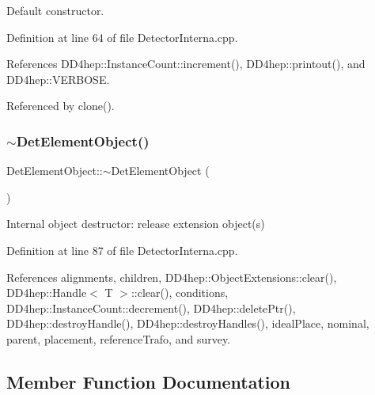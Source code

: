 Default constructor. 



Definition at line 64 of file Detector\+Interna.\+cpp.



References D\+D4hep\+::\+Instance\+Count\+::increment(), D\+D4hep\+::printout(), and D\+D4hep\+::\+V\+E\+R\+B\+O\+SE.



Referenced by clone().

\hypertarget{class_d_d4hep_1_1_geometry_1_1_det_element_object_a96c026595b89aa43a03d2406c52a778d}{}\label{class_d_d4hep_1_1_geometry_1_1_det_element_object_a96c026595b89aa43a03d2406c52a778d} 
\subsubsection{\texorpdfstring{$\sim$\+Det\+Element\+Object()}{~DetElementObject()}}
{\footnotesize\ttfamily Det\+Element\+Object\+::$\sim$\+Det\+Element\+Object (\begin{DoxyParamCaption}{ }\end{DoxyParamCaption})\hspace{0.3cm}{\ttfamily [virtual]}}



Internal object destructor\+: release extension object(s) 



Definition at line 87 of file Detector\+Interna.\+cpp.



References alignments, children, D\+D4hep\+::\+Object\+Extensions\+::clear(), D\+D4hep\+::\+Handle$<$ T $>$\+::clear(), conditions, D\+D4hep\+::\+Instance\+Count\+::decrement(), D\+D4hep\+::delete\+Ptr(), D\+D4hep\+::destroy\+Handle(), D\+D4hep\+::destroy\+Handles(), ideal\+Place, nominal, parent, placement, reference\+Trafo, and survey.



\subsection{Member Function Documentation}
\hypertarget{class_d_d4hep_1_1_geometry_1_1_det_element_object_af14fab1a6caabaad84336f6312ae5617}{}\label{class_d_d4hep_1_1_geometry_1_1_det_element_object_af14fab1a6caabaad84336f6312ae5617} 
